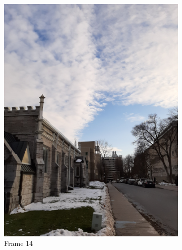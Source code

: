 \documentclass[conference]{IEEEtran}
\begin{document}
\begin{figure}[!h]
\begin{subfigure}[b]{0.2\linewidth}
    \includegraphics[width=\linewidth, angle = -90]{images/frame14.jpg}
    \caption{Frame 14}
  \end{subfigure}
  \begin{subfigure}[b]{0.2\linewidth}

\end{subfigure}
\end{figure}
\end{document}
